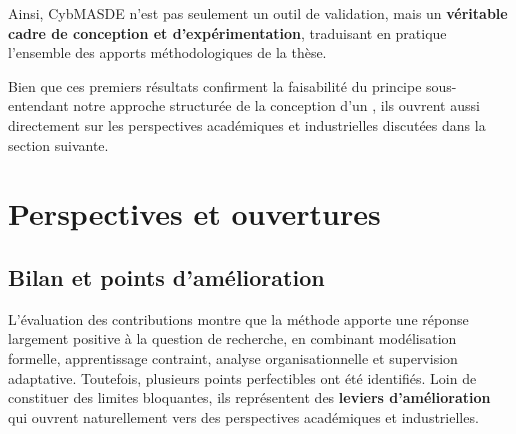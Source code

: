 Ainsi, CybMASDE n'est pas seulement un outil de validation, mais un \textbf{véritable cadre de conception et d'expérimentation}, traduisant en pratique l'ensemble des apports méthodologiques de la thèse.


\noindent
Bien que ces premiers résultats confirment la faisabilité du principe sous-entendant notre approche structurée de la conception d'un , ils ouvrent aussi directement sur les perspectives académiques et industrielles discutées dans la section suivante.

\section*{Perspectives et ouvertures}
\label{sec:perspectives}

\subsection*{Bilan et points d'amélioration}

L'évaluation des contributions montre que la méthode  apporte une réponse largement positive à la question de recherche, en combinant modélisation formelle, apprentissage contraint, analyse organisationnelle et supervision adaptative.
Toutefois, plusieurs points perfectibles ont été identifiés. Loin de constituer des limites bloquantes, ils représentent des \textbf{leviers d'amélioration} qui ouvrent naturellement vers des perspectives académiques et industrielles.

